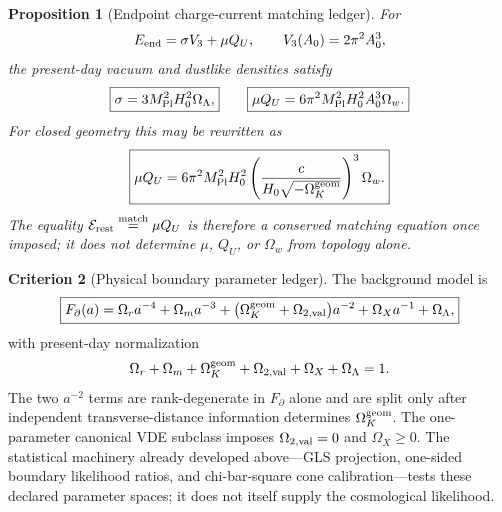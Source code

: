 \documentclass[11pt,a4paper]{article}
\def\QU{Q_U}%
\numberwithin{equation}{section}
\theoremstyle{definition}
\newtheorem{criterion}{Criterion}
\theoremstyle{plain}
\newtheorem{proposition}[criterion]{Proposition}
\theoremstyle{remark}
\newcommand{\QU}{Q_U}
\begin{document}
\begin{proposition}[Endpoint charge-current matching ledger]
\label{prop:endpoint-matching-ledger}
For
\begin{equation}
E_{\rm end}=\sigma V_3+\mu\QU,
\qquad V_3(A_0)=2\pi^2A_0^3,
\end{equation}
the present-day vacuum and dustlike densities satisfy
\begin{equation}
\boxed{\sigma=3M_{\rm Pl}^2H_0^2\Omega_\Lambda,}
\qquad
\boxed{\mu\QU=6\pi^2M_{\rm Pl}^2H_0^2A_0^3\Omega_w.}
\end{equation}
For closed geometry this may be rewritten as
\begin{equation}
\boxed{
\mu\QU=
6\pi^2M_{\rm Pl}^2H_0^2
\left(\frac{c}{H_0\sqrt{-\Omega_K^{\rm geom}}}\right)^3\Omega_w.}
\end{equation}
The equality
\(\mathcal E_{\rm rest}\overset{\rm match}{=}\mu\QU\) is therefore a conserved
matching equation once imposed; it does not determine \(\mu\), \(\QU\), or
\(\Omega_w\) from topology alone.
\end{proposition}

\begin{criterion}[Physical boundary parameter ledger]
The background model is
\begin{equation}
\boxed{
F_\partial(a)=
\Omega_ra^{-4}+\Omega_ma^{-3}
+\bigl(\Omega_K^{\rm geom}+\Omega_{2,{\rm val}}\bigr)a^{-2}
+\Omega_Xa^{-1}+\Omega_\Lambda,}
\end{equation}
with present-day normalization
\begin{equation}
\Omega_r+\Omega_m+\Omega_K^{\rm geom}+\Omega_{2,{\rm val}}
+\Omega_X+\Omega_\Lambda=1.
\end{equation}
The two \(a^{-2}\) terms are rank-degenerate in \(F_\partial\) alone and are
split only after independent transverse-distance information determines
\(\Omega_K^{\rm geom}\).  The one-parameter canonical VDE subclass imposes
\(\Omega_{2,{\rm val}}=0\) and \(\Omega_X\ge0\).  The statistical machinery
already developed above---GLS projection, one-sided boundary likelihood ratios,
and chi-bar-square cone calibration---tests these declared parameter spaces; it
does not itself supply the cosmological likelihood.
\end{criterion}
\end{document}
